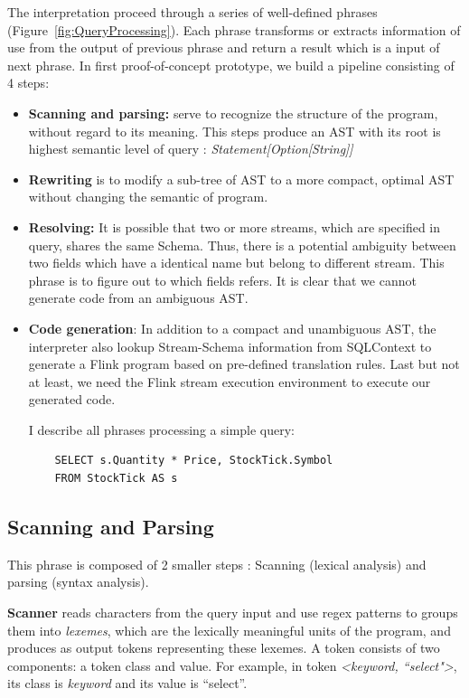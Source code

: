 The interpretation proceed through a series of well-defined phrases (Figure~\ref{fig:QueryProcessing}). Each phrase transforms or extracts information of use from the output of previous phrase and return a result which is a input of next phrase. In first proof-of-concept prototype, we build a pipeline consisting of 4 steps:
\begin{itemize}
	\item \textbf{Scanning and parsing:} serve to recognize the structure of the program, without regard to its meaning. This steps produce an AST with its root is highest semantic level of query : \textit{Statement[Option[String]]}

	\item \textbf{Rewriting} is to modify a sub-tree of AST to a more compact, optimal AST without changing the semantic of program.
	
	\item \textbf{Resolving:} It is possible that two or more streams, which are specified in query,  shares the same Schema. Thus, there is a potential ambiguity between two fields which have a identical name but belong to different stream. This phrase is to figure out to which fields refers. It is clear that we cannot generate code from an ambiguous AST.
	
	\item \textbf{Code generation}: In addition to a compact and unambiguous AST, the interpreter also lookup Stream-Schema information from SQLContext to generate a Flink program based on pre-defined translation rules. Last but not at least, we need the Flink stream execution environment to execute our generated code.
	
I describe all phrases processing a simple query: 
\begin{lstlisting}
	SELECT s.Quantity * Price, StockTick.Symbol 
	FROM StockTick AS s
\end{lstlisting}

\end{itemize}
\subsection{Scanning and Parsing}



This phrase is composed of 2 smaller steps : Scanning (lexical analysis) and parsing (syntax analysis).

\textbf{Scanner} reads characters from the query input and use regex patterns to groups them into \textit{lexemes}, which are the lexically meaningful units of the program, and produces as output tokens representing these lexemes. A token consists of two components: a token class and value. For example, in token \textit{<keyword, ``select">}, its class is \textit{keyword} and its value is ``select''. 

